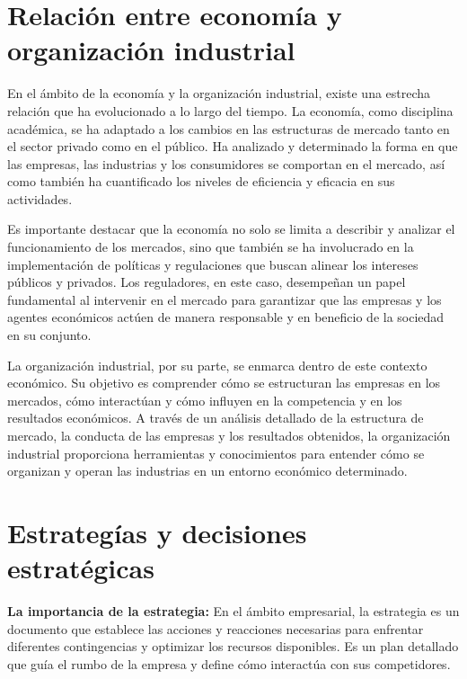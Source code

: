 \documentclass[
  a4paper,
]{article}
\begin{document}
\hypertarget{relaciuxf3n-entre-economuxeda-y-organizaciuxf3n-industrial}{%
\section{Relación entre economía y organización
industrial}\label{relaciuxf3n-entre-economuxeda-y-organizaciuxf3n-industrial}}

En el ámbito de la economía y la organización industrial, existe una
estrecha relación que ha evolucionado a lo largo del tiempo. La
economía, como disciplina académica, se ha adaptado a los cambios en las
estructuras de mercado tanto en el sector privado como en el público. Ha
analizado y determinado la forma en que las empresas, las industrias y
los consumidores se comportan en el mercado, así como también ha
cuantificado los niveles de eficiencia y eficacia en sus actividades.

Es importante destacar que la economía no solo se limita a describir y
analizar el funcionamiento de los mercados, sino que también se ha
involucrado en la implementación de políticas y regulaciones que buscan
alinear los intereses públicos y privados. Los reguladores, en este
caso, desempeñan un papel fundamental al intervenir en el mercado para
garantizar que las empresas y los agentes económicos actúen de manera
responsable y en beneficio de la sociedad en su conjunto.

La organización industrial, por su parte, se enmarca dentro de este
contexto económico. Su objetivo es comprender cómo se estructuran las
empresas en los mercados, cómo interactúan y cómo influyen en la
competencia y en los resultados económicos. A través de un análisis
detallado de la estructura de mercado, la conducta de las empresas y los
resultados obtenidos, la organización industrial proporciona
herramientas y conocimientos para entender cómo se organizan y operan
las industrias en un entorno económico determinado.

\hypertarget{estrateguxedas-y-decisiones-estratuxe9gicas}{%
\section{Estrategías y decisiones
estratégicas}\label{estrateguxedas-y-decisiones-estratuxe9gicas}}

\textbf{La importancia de la estrategia:} En el ámbito empresarial, la
estrategia es un documento que establece las acciones y reacciones
necesarias para enfrentar diferentes contingencias y optimizar los
recursos disponibles. Es un plan detallado que guía el rumbo de la
empresa y define cómo interactúa con sus competidores.
\end{document}
